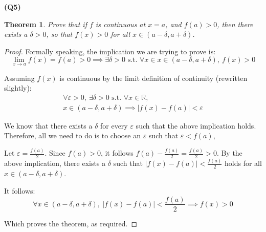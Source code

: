 \documentclass[12pt, a4paper]{article}
\renewcommand{\epsilon}{\varepsilon}
\newcommand{\displim}[1]{\displaystyle{\lim_{#1}}}
\newcommand{\st}{\text{ s.t. }}
\newcommand{\R}{\mathbb{R}}
\newtheorem{theorem}{Theorem}
\begin{document}
\textbf{(Q5)}

\begin{theorem}
    Prove that if $f$ is continuous at $x = a$, and $f(a) > 0$, then there exists
    a $\delta > 0$, so that $f(x) > 0$ for all $x \in (a - \delta, a + \delta)$.
\end{theorem}

\begin{proof}
    Formally speaking, the implication we are trying to prove is:
    \[
        \displim{x \to a} f(x) = f(a) > 0 \implies \exists \delta > 0 \st \forall x \in
        x \in (a - \delta, a + \delta), \: f(x) > 0
    \]

    Assuming $f(x)$ is continuous by the limit definition of continuity (rewritten slightly):
    \begin{gather*}
        \forall \epsilon > 0, \: \exists \delta > 0 \st \forall x \in \R,\\
        x \in (a - \delta, a + \delta) \implies |f(x) - f(a)| < \epsilon
    \end{gather*}

    We know that there exists a $\delta$ for every $\epsilon$ such that the above implication
    holds. Therefore, all we need to do is to choose an $\epsilon$ such that $\epsilon < f(a)$,

    Let $\epsilon = \frac{f(a)}{2}$. Since $f(a) > 0$, it follows
    $f(a) - \frac{f(a)}{2} = \frac{f(a)}{2} > 0$. By the above implication, there exists
    a $\delta$ such that $|f(x) - f(a)| < \frac{f(a)}{2}$ holds for all $x \in (a - \delta, a + \delta)$.

    It follows:
    \[
        \forall x \in (a - \delta, a + \delta), \:|f(x) - f(a)| < \frac{f(a)}{2} \implies f(x) > 0
    \]

    Which proves the theorem, as required.
\end{proof}
\end{document}
